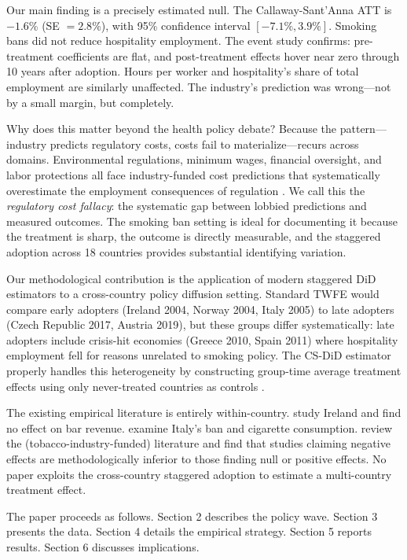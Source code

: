 \documentclass[12pt]{article}
\begin{document}
Our main finding is a precisely estimated null. The Callaway-Sant'Anna ATT is $-1.6$\% (SE $= 2.8$\%), with 95\% confidence interval $[-7.1\%, 3.9\%]$. Smoking bans did not reduce hospitality employment. The event study confirms: pre-treatment coefficients are flat, and post-treatment effects hover near zero through 10 years after adoption. Hours per worker and hospitality's share of total employment are similarly unaffected. The industry's prediction was wrong---not by a small margin, but completely.

Why does this matter beyond the health policy debate? Because the pattern---industry predicts regulatory costs, costs fail to materialize---recurs across domains. Environmental regulations, minimum wages, financial oversight, and labor protections all face industry-funded cost predictions that systematically overestimate the employment consequences of regulation \citep{eriksen2005}. We call this the \textit{regulatory cost fallacy}: the systematic gap between lobbied predictions and measured outcomes. The smoking ban setting is ideal for documenting it because the treatment is sharp, the outcome is directly measurable, and the staggered adoption across 18 countries provides substantial identifying variation.

Our methodological contribution is the application of modern staggered DiD estimators to a cross-country policy diffusion setting. Standard TWFE would compare early adopters (Ireland 2004, Norway 2004, Italy 2005) to late adopters (Czech Republic 2017, Austria 2019), but these groups differ systematically: late adopters include crisis-hit economies (Greece 2010, Spain 2011) where hospitality employment fell for reasons unrelated to smoking policy. The CS-DiD estimator properly handles this heterogeneity by constructing group-time average treatment effects using only never-treated countries as controls \citep{goodman2021}.

The existing empirical literature is entirely within-country. \citet{cornelsen2012} study Ireland and find no effect on bar revenue. \citet{pieroni2013} examine Italy's ban and cigarette consumption. \citet{scollo2003} review the (tobacco-industry-funded) literature and find that studies claiming negative effects are methodologically inferior to those finding null or positive effects. No paper exploits the cross-country staggered adoption to estimate a multi-country treatment effect.

The paper proceeds as follows. Section 2 describes the policy wave. Section 3 presents the data. Section 4 details the empirical strategy. Section 5 reports results. Section 6 discusses implications.
\end{document}
